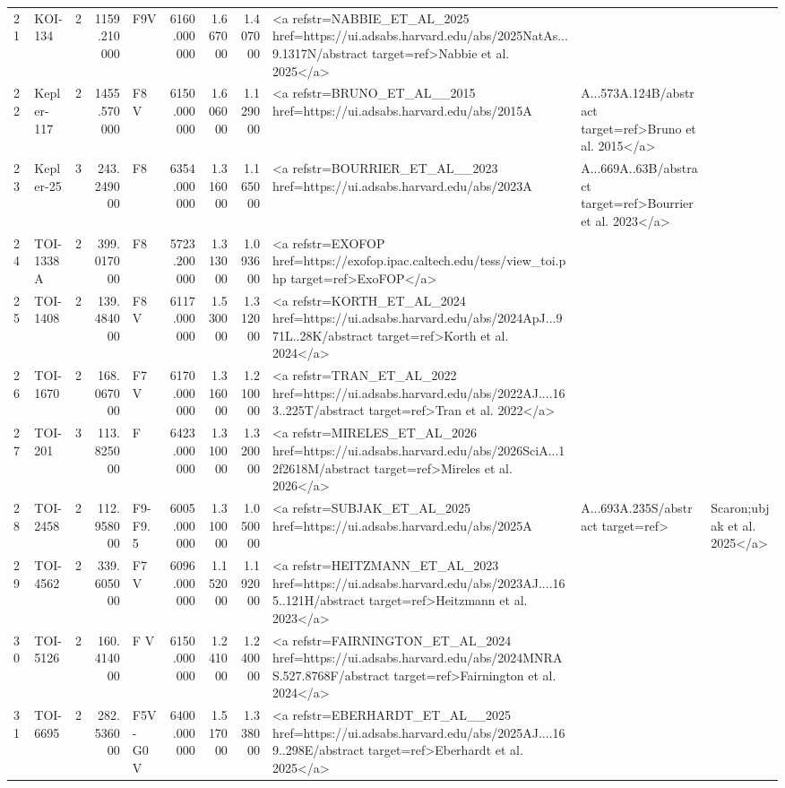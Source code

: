 \begin{tabular}{llrrlrrrl}
21 & KOI-134 & 2 & 1159.210000 & F9V & 6160.000000 & 1.667000 & 1.407000 & <a refstr=NABBIE_ET_AL_2025 href=https://ui.adsabs.harvard.edu/abs/2025NatAs...9.1317N/abstract target=ref>Nabbie et al. 2025</a> \\
22 & Kepler-117 & 2 & 1455.570000 & F8 V & 6150.000000 & 1.606000 & 1.129000 & <a refstr=BRUNO_ET_AL__2015 href=https://ui.adsabs.harvard.edu/abs/2015A&A...573A.124B/abstract target=ref>Bruno et al. 2015</a> \\
23 & Kepler-25 & 3 & 243.249000 & F8 & 6354.000000 & 1.316000 & 1.165000 & <a refstr=BOURRIER_ET_AL__2023 href=https://ui.adsabs.harvard.edu/abs/2023A&A...669A..63B/abstract target=ref>Bourrier et al. 2023</a> \\
24 & TOI-1338 A & 2 & 399.017000 & F8 & 5723.200000 & 1.313000 & 1.093600 & <a refstr=EXOFOP href=https://exofop.ipac.caltech.edu/tess/view_toi.php target=ref>ExoFOP</a> \\
25 & TOI-1408 & 2 & 139.484000 & F8 V & 6117.000000 & 1.530000 & 1.312000 & <a refstr=KORTH_ET_AL_2024 href=https://ui.adsabs.harvard.edu/abs/2024ApJ...971L..28K/abstract target=ref>Korth et al. 2024</a> \\
26 & TOI-1670 & 2 & 168.067000 & F7 V & 6170.000000 & 1.316000 & 1.210000 & <a refstr=TRAN_ET_AL_2022 href=https://ui.adsabs.harvard.edu/abs/2022AJ....163..225T/abstract target=ref>Tran et al. 2022</a> \\
27 & TOI-201 & 3 & 113.825000 & F & 6423.000000 & 1.310000 & 1.320000 & <a refstr=MIRELES_ET_AL_2026 href=https://ui.adsabs.harvard.edu/abs/2026SciA...12f2618M/abstract target=ref>Mireles et al. 2026</a> \\
28 & TOI-2458 & 2 & 112.958000 & F9-F9.5 & 6005.000000 & 1.310000 & 1.050000 & <a refstr=SUBJAK_ET_AL_2025 href=https://ui.adsabs.harvard.edu/abs/2025A&A...693A.235S/abstract target=ref>&Scaron;ubjak et al. 2025</a> \\
29 & TOI-4562 & 2 & 339.605000 & F7 V & 6096.000000 & 1.152000 & 1.192000 & <a refstr=HEITZMANN_ET_AL_2023 href=https://ui.adsabs.harvard.edu/abs/2023AJ....165..121H/abstract target=ref>Heitzmann et al. 2023</a> \\
30 & TOI-5126 & 2 & 160.414000 & F V & 6150.000000 & 1.241000 & 1.240000 & <a refstr=FAIRNINGTON_ET_AL_2024 href=https://ui.adsabs.harvard.edu/abs/2024MNRAS.527.8768F/abstract target=ref>Fairnington et al. 2024</a> \\
31 & TOI-6695 & 2 & 282.536000 & F5V-G0V & 6400.000000 & 1.517000 & 1.338000 & <a refstr=EBERHARDT_ET_AL__2025 href=https://ui.adsabs.harvard.edu/abs/2025AJ....169..298E/abstract target=ref>Eberhardt et al. 2025</a> \\

\end{tabular}
